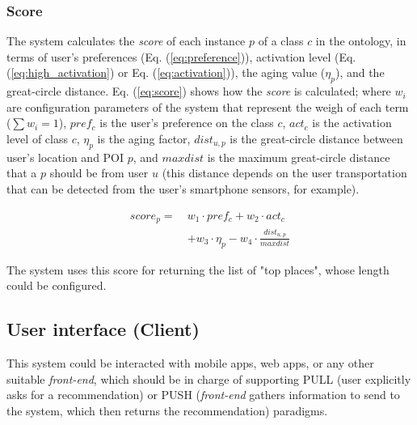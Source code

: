 \subsubsection{\bf Score} \label{section:score}
The system calculates the \textit{score} of each instance $p$ of a class $c$ in  the ontology, in terms of user's preferences (Eq. (\ref{eq:preference})), activation level (Eq. (\ref{eq:high_activation}) or Eq. (\ref{eq:activation})), the aging value ($\eta_p$), and the great-circle distance. Eq. (\ref{eq:score}) shows how the \textit{score} is calculated; where $w_i$ are configuration parameters of the system that represent the weigh of each term ($\sum w_i =1$), $pref_c$ is the user's preference on the class $c$, $act_c$ is the activation level of class $c$, $\eta_p$ is the aging factor, $dist_{u,p}$ is the great-circle distance between user's location and POI $p$, and $maxdist$ is the maximum great-circle distance that a $p$ should be from user $u$  (this distance depends on the user transportation that can be detected  from the user's smartphone sensors, for example).


\begin{equation} \label{eq:score}
    \begin{split}
score_p =   \ &w_1 \cdot pref_c + w_2 \cdot act_c \\
                                        &+ w_3 \cdot \eta_p - w_4 \cdot \frac{dist_{u,p}}{maxdist}
    \end{split}
\end{equation}

The system uses this score for returning the list of "top places", whose length could be configured.

\subsection{User interface (Client)}
This system could be interacted with mobile apps, web apps, or any other suitable \textit{front-end}, which should be in charge of supporting PULL (user explicitly asks for a recommendation) or PUSH (\textit{front-end} gathers information to send to the system, which then returns the recommendation) paradigms.



